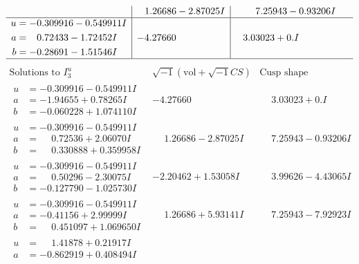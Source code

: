 \documentclass[1p]{elsarticle_modified}
\theoremstyle{definition}
\newcommand{\I}{\sqrt{-1}}
\begin{document}
$$\begin{array}{c|c|c}
 & \phantom{-}1.26686 - 2.87025 I & \phantom{-}7.25943 - 0.93206 I \\ \hline\begin{aligned}
u &= -0.309916 - 0.549911 I \\
a &= \phantom{-}0.72433 - 1.72452 I \\
b &= -0.28691 - 1.51546 I\end{aligned}
 & -4.27660\phantom{ +0.000000I} & \phantom{-}3.03023 + 0. I\phantom{ +0.000000I}\\
 \hline 
 \end{array}$$\newpage$$\begin{array}{c|c|c}  
\text{Solutions to }I^u_{3}& \I (\text{vol} + \sqrt{-1}CS) & \text{Cusp shape}\\
 \hline 
\begin{aligned}
u &= -0.309916 - 0.549911 I \\
a &= -1.94655 + 0.78265 I \\
b &= -0.060228 + 1.074110 I\end{aligned}
 & -4.27660\phantom{ +0.000000I} & \phantom{-}3.03023 + 0. I\phantom{ +0.000000I} \\ \hline\begin{aligned}
u &= -0.309916 - 0.549911 I \\
a &= \phantom{-}0.72536 + 2.06070 I \\
b &= \phantom{-}0.330888 + 0.359958 I\end{aligned}
 & \phantom{-}1.26686 - 2.87025 I & \phantom{-}7.25943 - 0.93206 I \\ \hline\begin{aligned}
u &= -0.309916 - 0.549911 I \\
a &= \phantom{-}0.50296 - 2.30075 I \\
b &= -0.127790 - 1.025730 I\end{aligned}
 & -2.20462 + 1.53058 I & \phantom{-}3.99626 - 4.43065 I \\ \hline\begin{aligned}
u &= -0.309916 - 0.549911 I \\
a &= -0.41156 + 2.99999 I \\
b &= \phantom{-}0.451097 + 1.069650 I\end{aligned}
 & \phantom{-}1.26686 + 5.93141 I & \phantom{-}7.25943 - 7.92923 I \\ \hline\begin{aligned}
u &= \phantom{-}1.41878 + 0.21917 I \\
a &= -0.862919 + 0.408494 I \\

\end{aligned}
\end{array}$$
\end{document}
